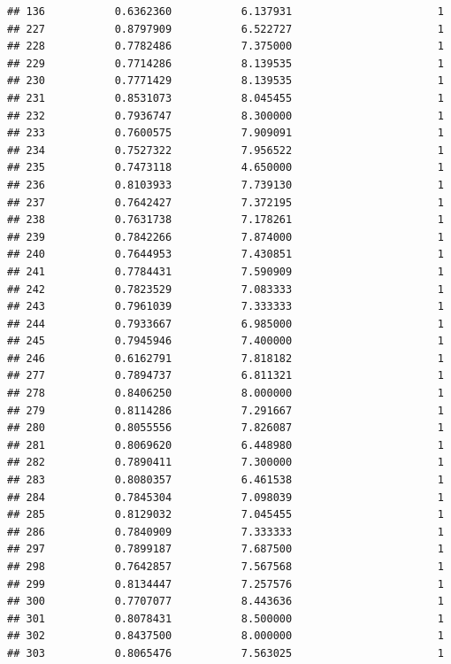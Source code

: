 \documentclass[]{article}
\begin{document}
\begin{verbatim}
## 136           0.6362360           6.137931                       1
## 227           0.8797909           6.522727                       1
## 228           0.7782486           7.375000                       1
## 229           0.7714286           8.139535                       1
## 230           0.7771429           8.139535                       1
## 231           0.8531073           8.045455                       1
## 232           0.7936747           8.300000                       1
## 233           0.7600575           7.909091                       1
## 234           0.7527322           7.956522                       1
## 235           0.7473118           4.650000                       1
## 236           0.8103933           7.739130                       1
## 237           0.7642427           7.372195                       1
## 238           0.7631738           7.178261                       1
## 239           0.7842266           7.874000                       1
## 240           0.7644953           7.430851                       1
## 241           0.7784431           7.590909                       1
## 242           0.7823529           7.083333                       1
## 243           0.7961039           7.333333                       1
## 244           0.7933667           6.985000                       1
## 245           0.7945946           7.400000                       1
## 246           0.6162791           7.818182                       1
## 277           0.7894737           6.811321                       1
## 278           0.8406250           8.000000                       1
## 279           0.8114286           7.291667                       1
## 280           0.8055556           7.826087                       1
## 281           0.8069620           6.448980                       1
## 282           0.7890411           7.300000                       1
## 283           0.8080357           6.461538                       1
## 284           0.7845304           7.098039                       1
## 285           0.8129032           7.045455                       1
## 286           0.7840909           7.333333                       1
## 297           0.7899187           7.687500                       1
## 298           0.7642857           7.567568                       1
## 299           0.8134447           7.257576                       1
## 300           0.7707077           8.443636                       1
## 301           0.8078431           8.500000                       1
## 302           0.8437500           8.000000                       1
## 303           0.8065476           7.563025                       1

\end{verbatim}
\end{document}
